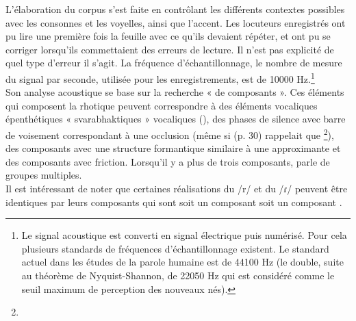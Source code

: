 L'élaboration du corpus s'est faite en contrôlant les différents contextes possibles avec les consonnes et les voyelles, ainsi que l'accent. Les locuteurs enregistrés ont pu lire une première fois la feuille avec ce qu'ils devaient répéter, et ont pu se corriger lorsqu'ils commettaient des erreurs de lecture. Il n'est pas explicité de quel type d'erreur il s'agit. La fréquence d'échantillonnage, le nombre de mesure du signal par seconde, utilisée pour les enregistrements, est de 10000 Hz.\footnote{Le signal acoustique est converti en signal électrique puis numérisé. Pour cela plusieurs standards de fréquences d'échantillonnage existent. Le standard actuel dans les études de la parole humaine est de 44100 Hz (le double, suite au théorème de Nyquist-Shannon, de 22050 Hz qui est considéré comme le seuil maximum de perception des nouveaux nés).}\\

Son analyse acoustique se base sur la recherche « de composants ». Ces éléments qui composent la rhotique peuvent correspondre à des éléments vocaliques épenthétiques « svarabhaktiques » vocaliques (), des phases de silence avec barre de voisement correspondant à une occlusion (même si \citeauthor{blecuaVibrantesEspanolManifestaciones2002} (p. 30) rappelait que \footnote{}), des composants avec une structure formantique similaire à une approximante et des composants avec friction. Lorsqu’il y a plus de trois composants, \citeauthor{blecuaVibrantesEspanolManifestaciones2002} parle de groupes multiples.\\

Il est intéressant de noter que certaines réalisations du /r/ et du /ɾ/ peuvent être identiques par leurs composants qui sont soit un composant  soit un composant .\\

